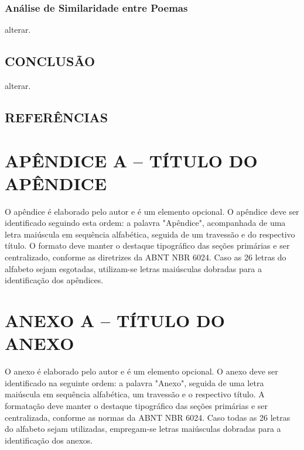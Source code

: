 \documentclass[
	article,
	12pt,
	oneside,
	a4paper,
	english,
	brazil,
	sumario=tradicional
]{abntex2}
\begin{document}
\subsection{Análise de Similaridade entre Poemas}

alterar.

% 

\section{\textbf{CONCLUSÃO}}
\label{sec:conclusao}

alterar.

\postextual

\section*{\textbf{REFERÊNCIAS}}

\renewcommand{\bibname}{}



\renewcommand{\glossaryname}{\textbf{GLOSSÁRIO}}
\renewcommand{\glossarypreamble}{
	Elemento opcional. Deve ser elaborado em ordem alfabética.\\ \\
}


\printglossaries

\vspace{\onelineskip}
\vspace{\onelineskip}

\chapter*{\textbf{APÊNDICE A – TÍTULO DO APÊNDICE}}

O apêndice é elaborado pelo autor e é um elemento opcional. O apêndice deve ser identificado seguindo esta ordem: a palavra "Apêndice", acompanhada de uma letra maiúscula em sequência alfabética, seguida de um travessão e do respectivo título. O formato deve manter o destaque tipográfico das seções primárias e ser centralizado, conforme as diretrizes da ABNT NBR 6024. Caso as 26 letras do alfabeto sejam esgotadas, utilizam-se letras maiúsculas dobradas para a identificação dos apêndices.

\vspace{\onelineskip}


\chapter*{\textbf{ANEXO A – TÍTULO DO ANEXO}}

O anexo é elaborado pelo autor e é um elemento opcional. O anexo deve ser identificado na seguinte ordem: a palavra "Anexo", seguida de uma letra maiúscula em sequência alfabética, um travessão e o respectivo título. A formatação deve manter o destaque tipográfico das seções primárias e ser centralizada, conforme as normas da ABNT NBR 6024. Caso todas as 26 letras do alfabeto sejam utilizadas, empregam-se letras maiúsculas dobradas para a identificação dos anexos.
\end{document}

